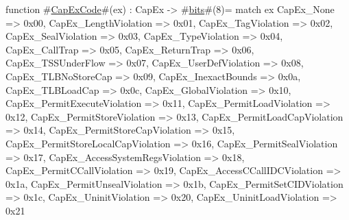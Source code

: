function #\hyperref[zCapExCode]{CapExCode}#(ex) : CapEx -> #\hyperref[zbits]{bits}#(8)=
  match ex {
    CapEx_None                          => 0x00,
    CapEx_LengthViolation               => 0x01,
    CapEx_TagViolation                  => 0x02,
    CapEx_SealViolation                 => 0x03,
    CapEx_TypeViolation                 => 0x04,
    CapEx_CallTrap                      => 0x05,
    CapEx_ReturnTrap                    => 0x06,
    CapEx_TSSUnderFlow                  => 0x07,
    CapEx_UserDefViolation              => 0x08,
    CapEx_TLBNoStoreCap                 => 0x09,
    CapEx_InexactBounds                 => 0x0a,
    CapEx_TLBLoadCap                    => 0x0c,
    CapEx_GlobalViolation               => 0x10,
    CapEx_PermitExecuteViolation        => 0x11,
    CapEx_PermitLoadViolation           => 0x12,
    CapEx_PermitStoreViolation          => 0x13,
    CapEx_PermitLoadCapViolation        => 0x14,
    CapEx_PermitStoreCapViolation       => 0x15,
    CapEx_PermitStoreLocalCapViolation  => 0x16,
    CapEx_PermitSealViolation           => 0x17,
    CapEx_AccessSystemRegsViolation     => 0x18,
    CapEx_PermitCCallViolation          => 0x19,
    CapEx_AccessCCallIDCViolation       => 0x1a,
    CapEx_PermitUnsealViolation         => 0x1b,
    CapEx_PermitSetCIDViolation         => 0x1c,
    CapEx_UninitViolation               => 0x20,
    CapEx_UninitLoadViolation           => 0x21
  }
